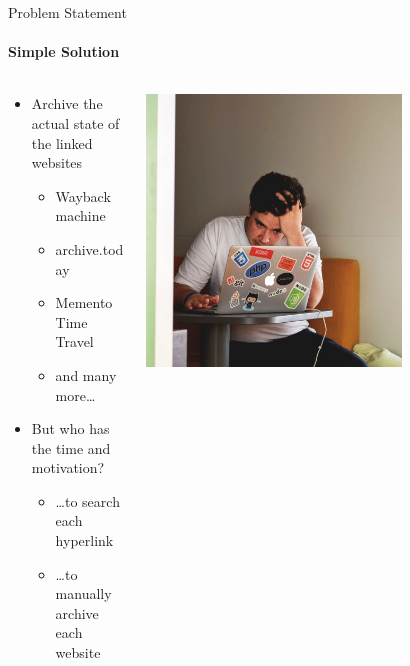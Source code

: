 \documentclass[
    ngerman,%
    authorontitle=true,
]{bfhbeamer}
\begin{document}
    \begin{frame}{Problem Statement}
        \framesubtitle{Simple Solution}
        \begin{columns} %
            \begin{column}{0.5\textwidth} %
                \begin{itemize}
                    \item Archive the actual state of the linked websites
                    \begin{itemize}
                        \item Wayback machine
                        \item archive.today
                        \item Memento Time Travel
                        \item and many more…
                    \end{itemize}
                    \item But who has the time and motivation?
                    \begin{itemize}
                        \item \ldots to search each hyperlink
                        \item \ldots to manually archive each website
                    \end{itemize}
                \end{itemize}
            \end{column}
            \begin{column}{0.4\textwidth} %
                \begin{center}
                    \includegraphics[width=0.7\textwidth]{pictures/frustrated}
                \end{center}
            \end{column}
        \end{columns}
    \end{frame}
\end{document}
